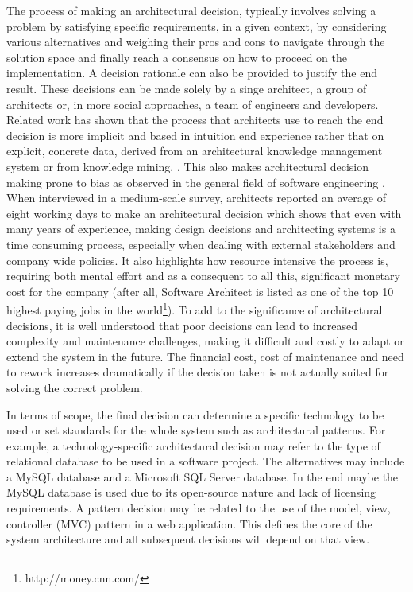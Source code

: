         The process of making an architectural decision, typically involves solving a problem by satisfying specific requirements, in a given context, by considering various alternatives and weighing their pros and cons to navigate through the solution space and finally reach a consensus on how to proceed on the implementation. A decision rationale can also be provided to justify the end result. These decisions can be made solely by a singe architect, a group of architects or, in more social approaches, a team of engineers and developers. Related work has shown that the process that architects use to reach the end decision is more implicit and based in intuition end experience rather that on explicit, concrete data, derived from an architectural knowledge management system or from knowledge mining. \cite{Architecture-reasoning}. This also makes architectural decision making prone to bias as observed in the general field of software engineering \cite{bias_in_software_eng}. When interviewed in a medium-scale survey, architects reported an average of eight working days to make an architectural decision which shows that even with many years of experience, making design decisions and architecting systems is a time consuming process, especially when dealing with external stakeholders and company wide policies. It also highlights how resource intensive the process is, requiring both mental effort and as a consequent to all this, significant monetary cost for the company\cite{archtitect_survey} (after all, Software Architect is listed as one of the top 10 highest paying jobs in the world\footnote{http://money.cnn.com/}). To add to the significance of architectural decisions, it is well understood that poor decisions can lead to increased complexity and maintenance challenges, making it difficult and costly to adapt or extend the system in the future. The financial cost, cost of maintenance and need to rework increases dramatically if the decision taken is not actually suited for solving the correct problem.  
        
        In terms of scope, the final decision can determine a specific technology to be used \cite{developer-study-arch-decisions}or set standards for the whole system such as architectural patterns. For example, a technology-specific architectural decision may refer to the type of relational database to be used in a software project. The alternatives may include a MySQL database and a Microsoft SQL Server database. In the end maybe the MySQL database is used due to its open-source nature and lack of licensing requirements. A pattern decision may be related to the use of the model, view, controller (MVC) pattern in a web application. This defines the core of the system architecture and all subsequent decisions will depend on that view.

